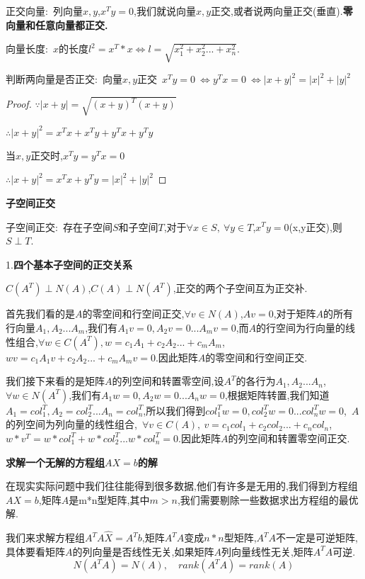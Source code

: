 \documentclass[oneside]{book}
\begin{document}
	正交向量:\ 列向量$x,y$,$x^{T}y=0$,我们就说向量$x,y$正交,或者说两向量正交(垂直).\textbf{零向量和任意向量都正交.}
	
	向量长度:\ $x$的长度$l^{2}=x^{T}*x\Leftrightarrow l=\sqrt{x_{1}^{2}+x_{2}^{2}...+x_{n}^{2}}$.
	
	判断两向量是否正交:\ 向量$x,y$正交\ $x^{T}y=0\ \Leftrightarrow y^{T}x=0\ \Leftrightarrow |x+y|^{2}=|x|^{2}+|y|^{2}$
	\begin{proof}
		$\because |x+y|=\sqrt{(x+y)^{T}(x+y)}$
		
		$\therefore |x+y|^{2}=x^{T}x+x^{T}y+y^{T}x+y^{T}y$
		
		当$x,y$正交时,$x^{T}y=y^{T}x=0$
		
		$\therefore |x+y|^{2}=x^{T}x+y^{T}y=|x|^{2}+|y|^{2}$
	\end{proof}
	\textbf{子空间正交}
	
	子空间正交:\ 存在子空间$S$和子空间$T$,对于$\forall x \in S,\ \forall y\in T$,$x^{T}y=0$(x,y正交),则$S\perp T$.
	
	1.\textbf{四个基本子空间的正交关系}
	
	$C(A^{T})\perp N(A)$,\qquad $C(A)\perp N(A^{T})$,\qquad 正交的两个子空间互为正交补.
	
	首先我们看的是$A$的零空间和行空间正交,$\forall v\in N(A)$,$Av=0$,对于矩阵$A$的所有行向量$A_{1},A_{2}...A_{m}$,我们有$A_{1}v=0,A_{2}v=0...A_{m}v=0$,而$A$的行空间为行向量的线性组合,$\forall w \in C(A^{T}),w=c_{1}A_{1}+c_{2}A_{2}...+c_{m}A_{m}$,\ $wv=c_{1}A_{1}v+c_{2}A_{2}...+c_{m}A_{m}v=0$.因此矩阵$A$的零空间和行空间正交.
	
	我们接下来看的是矩阵$A$的列空间和转置零空间,设$A^{T}$的各行为$A_{1},A_{2}...A_{n}$,$\forall w\in N(A^{T})$,我们有$A_{1}w=0,A_{2}w=0...A_{n}w=0$,根据矩阵转置,我们知道$A_{1}=col_{1}^{T},A_{2}=col_{2}^{T}...A_{n}=col_{n}^{T}$,所以我们得到$col_{1}^{T}w=0,col_{2}^{T}w=0...col_{n}^{T}w=0$,\ $A$的列空间为列向量的线性组合,\ $\forall v\in C(A),\ v=c_{1}col_{1}+c_{2}col_{2}...+c_{n}col_{n}$,$w*v^{T}=w*col_{1}^{T}+w*col_{2}^{T}...w*col_{n}^{T}=0$.因此矩阵$A$的列空间和转置零空间正交.
	
	\textbf{求解一个无解的方程组$AX=b$的解}
	
	在现实实际问题中我们往往能得到很多数据,他们有许多是无用的,我们得到方程组$AX=b$,矩阵$A$是m*n型矩阵,其中$m>n$,我们需要剔除一些数据求出方程组的最优解.
	
	我们来求解方程组$A^{T}A\hat{X}=A^{T}b$,矩阵$A^{T}A$变成$n*n$型矩阵,$A^{T}A$不一定是可逆矩阵,具体要看矩阵$A$的列向量是否线性无关,如果矩阵$A$列向量线性无关,矩阵$A^{T}A$可逆.
	$$N(A^{T}A)=N(A),\quad rank(A^{T}A)=rank(A)$$
\end{document}
